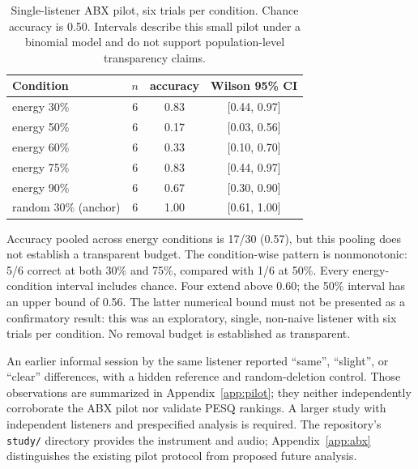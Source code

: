 \documentclass[11pt,a4paper]{article}
\begin{document}
\begin{table}[htbp]
\centering
\caption{Single-listener ABX pilot, six trials per condition. Chance accuracy is 0.50. Intervals describe this small pilot under a binomial model and do not support population-level transparency claims.}
\label{tab:abx}
\small
\begin{tabular}{@{}lccc@{}}
\toprule
\textbf{Condition} & \textbf{$n$} & \textbf{accuracy} & \textbf{Wilson 95\% CI} \\
\midrule
energy 30\% & 6 & 0.83 & [0.44, 0.97] \\
energy 50\% & 6 & 0.17 & [0.03, 0.56] \\
energy 60\% & 6 & 0.33 & [0.10, 0.70] \\
energy 75\% & 6 & 0.83 & [0.44, 0.97] \\
energy 90\% & 6 & 0.67 & [0.30, 0.90] \\
random 30\% (anchor) & 6 & 1.00 & [0.61, 1.00] \\
\bottomrule
\end{tabular}
\end{table}


Accuracy pooled across energy conditions is 17/30 (0.57), but this pooling does not establish a transparent budget. The condition-wise pattern is nonmonotonic: 5/6 correct at both 30\% and 75\%, compared with 1/6 at 50\%. Every energy-condition interval includes chance. Four extend above 0.60; the 50\% interval has an upper bound of 0.56. The latter numerical bound must not be presented as a confirmatory result: this was an exploratory, single, non-naive listener with six trials per condition. No removal budget is established as transparent.

An earlier informal session by the same listener reported ``same'', ``slight'', or ``clear'' differences, with a hidden reference and random-deletion control. Those observations are summarized in Appendix~\ref{app:pilot}; they neither independently corroborate the ABX pilot nor validate PESQ rankings. A larger study with independent listeners and prespecified analysis is required. The repository's \texttt{study/} directory provides the instrument and audio; Appendix~\ref{app:abx} distinguishes the existing pilot protocol from proposed future analysis.
\end{document}
